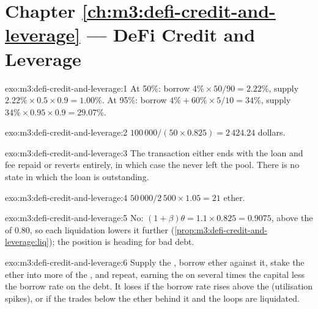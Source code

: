 \section*{Chapter \ref{ch:m3:defi-credit-and-leverage} --- DeFi Credit and Leverage}

\begin{solution}{exo:m3:defi-credit-and-leverage:1}
At 50\%: borrow $4\% \times 50/90 = 2.22\%$, supply $2.22\% \times 0.5 \times 0.9 = 1.00\%$. At 95\%: borrow $4\% + 60\% \times 5/10 = 34\%$,
supply $34\% \times 0.95 \times 0.9 = 29.07\%$.
\end{solution}

\begin{solution}{exo:m3:defi-credit-and-leverage:2}
$100\,000/(50 \times 0.825) = 2\,424.24$ dollars.
\end{solution}

\begin{solution}{exo:m3:defi-credit-and-leverage:3}
The transaction either ends with the loan and fee repaid or reverts entirely, in which case the  never left the pool. There is no state in
which the loan is outstanding.
\end{solution}

\begin{solution}{exo:m3:defi-credit-and-leverage:4}
$50\,000/2\,500 \times 1.05 = 21$ ether.
\end{solution}

\begin{solution}{exo:m3:defi-credit-and-leverage:5}
No: $(1 + \beta)\theta = 1.1 \times 0.825 = 0.9075$, above the  of 0.80, so each liquidation lowers it further
(\cref{prop:m3:defi-credit-and-leverage:liq}); the position is heading for bad debt.
\end{solution}

\begin{solution}{exo:m3:defi-credit-and-leverage:6}
Supply the , borrow ether against it, stake the ether into more of the , and repeat, earning the  on several
times the capital less the borrow rate on the debt. It loses if the borrow rate rises above the  (utilisation spikes), or if the 
trades below the ether behind it and the loops are liquidated.
\end{solution}

